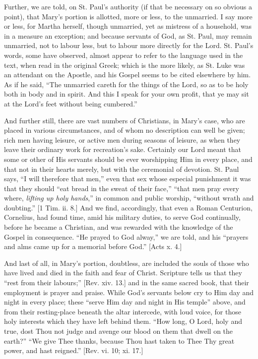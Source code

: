 Further, we are told, on St. Paul's authority (if that be
necessary on so obvious a point), that Mary's portion is allotted,
more or less, to the unmarried. I say more or less, for Martha
herself, though unmarried, yet as mistress of a household, was in a
measure an exception; and because servants of God, as St. Paul, may
remain unmarried, not to labour less, but to labour more directly for
the Lord. St. Paul's words, some have observed, almost appear to
refer to the language used in the text, when read in the original
Greek; which is the more likely, as St. Luke was an attendant on the
Apostle, and his Gospel seems to be cited elsewhere by him. As if he
said, ``The unmarried careth for the things of the Lord, so as to
be holy both in body and in spirit. And this I speak for your own
profit, that ye may sit at the Lord's feet without being
cumbered.''

And further still, there are vast numbers of Christians, in Mary's
case, who are placed in various circumstances, and of whom no
description can well be given; rich men having leisure, or active men
during seasons of leisure, as when they leave their ordinary work for
recreation's sake. Certainly our Lord meant that some or other of
His servants should be ever worshipping Him in every place, and that
not in their hearts merely, but with the ceremonial of devotion. St.
Paul says, ``I will therefore that men,'' even that sex whose
especial punishment it was that they should ``eat bread in the
sweat of their face,'' ``that men pray every where, \emph{lifting
up holy hands},'' in common and public worship, ``without
wrath and doubting.'' [1 Tim. ii. 8.] And we find, accordingly,
that even a Roman Centurion, Cornelius, had found time, amid his
military duties, to serve God continually, before he became a
Christian, and was rewarded with the knowledge of the Gospel in
consequence. ``He prayed to God alway,'' we are told, and his
``prayers and alms came up for a memorial before God.'' [Acts
x. 4.]

And last of all, in Mary's portion, doubtless, are included the
souls of those who have lived and died in the faith and fear of
Christ. Scripture tells us that they ``rest from their labours;''
[Rev. xiv. 13.] and in the same sacred book, that their employment is
prayer and praise. While God's servants below cry to Him day and
night in every place; these ``serve Him day and night in His
temple'' above, and from their resting-place beneath the altar
intercede, with loud voice, for those holy interests which they have
left behind them. ``How long, O Lord, holy and true, dost Thou not
judge and avenge our blood on them that dwell on the earth?''
``We give Thee thanks, because Thou hast taken to Thee Thy great
power, and hast reigned.'' [Rev. vi. 10; xi. 17.]

